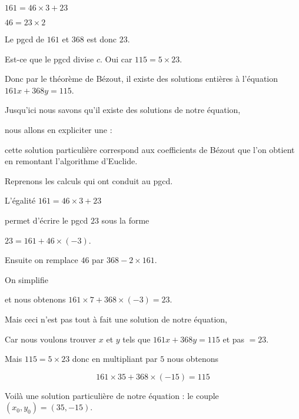 \change

$161  =  46  \times  3  +  23$

\change

$46   =  23    \times  2$

\change

Le pgcd de $161$ et $368$ est donc $23$.

\change

Est-ce que le pgcd  divise $c$. Oui car $115=5 \times 23$.

\change 

Donc par le théorème de Bézout, il existe des solutions entières à
l'équation $161 x + 368 y=115$.

\diapo

Jusqu'ici nous savons qu'il existe des solutions de
notre équation, 

nous allons en expliciter une : 

 cette solution particulière correspond aux coefficients de Bézout 
que l'on obtient en remontant l'algorithme d'Euclide.

\change

Reprenons les calculs qui ont conduit au pgcd.

\change

L'égalité
$161  =  46  \times  3  +  23$

permet d'écrire le pgcd $23$ sous la forme

$23=161+46\times(-3)$.

\change

Ensuite on remplace $46$ 
par $368 - 2\times 161$.

\change 

On simplifie

\change

et nous obtenons $161\times7 + 368\times(-3)=23$.

Mais ceci n'est pas tout à fait une solution de notre équation,

Car nous voulons trouver $x$ et $y$ tels que 
$161 x + 368 y=115$ et pas $=23$.

\change

Mais $115 = 5\times 23$ donc en multipliant par $5$ nous obtenons

\change

$$161\times35 + 368\times(-15)=115$$

\change

Voilà une solution particulière de notre équation  :
le couple $(x_0,y_0) = (35,-15)$.


